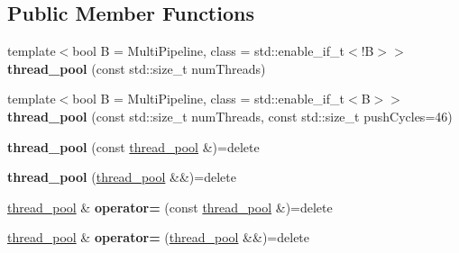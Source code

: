 \subsection*{Public Member Functions}
\begin{DoxyCompactItemize}
\item 
\mbox{\label{classsequoia_1_1concurrency_1_1thread__pool_a70dbd1cce0c534b03b8255945afe1ab3}} 
{\footnotesize template$<$bool B = Multi\+Pipeline, class  = std\+::enable\+\_\+if\+\_\+t$<$!\+B$>$$>$ }\\{\bfseries thread\+\_\+pool} (const std\+::size\+\_\+t num\+Threads)
\item 
\mbox{\label{classsequoia_1_1concurrency_1_1thread__pool_acedcbcd7f9b06df68eafa7af26327a1e}} 
{\footnotesize template$<$bool B = Multi\+Pipeline, class  = std\+::enable\+\_\+if\+\_\+t$<$\+B$>$$>$ }\\{\bfseries thread\+\_\+pool} (const std\+::size\+\_\+t num\+Threads, const std\+::size\+\_\+t push\+Cycles=46)
\item 
\mbox{\label{classsequoia_1_1concurrency_1_1thread__pool_a43bb826eda0785a478b90dd01d436194}} 
{\bfseries thread\+\_\+pool} (const \mbox{\hyperlink{classsequoia_1_1concurrency_1_1thread__pool}{thread\+\_\+pool}} \&)=delete
\item 
\mbox{\label{classsequoia_1_1concurrency_1_1thread__pool_a81a375145949bd9064545e3d46bce1fa}} 
{\bfseries thread\+\_\+pool} (\mbox{\hyperlink{classsequoia_1_1concurrency_1_1thread__pool}{thread\+\_\+pool}} \&\&)=delete
\item 
\mbox{\label{classsequoia_1_1concurrency_1_1thread__pool_aa47415876ba7be4e3ba67228f3e2918d}} 
\mbox{\hyperlink{classsequoia_1_1concurrency_1_1thread__pool}{thread\+\_\+pool}} \& {\bfseries operator=} (const \mbox{\hyperlink{classsequoia_1_1concurrency_1_1thread__pool}{thread\+\_\+pool}} \&)=delete
\item 
\mbox{\label{classsequoia_1_1concurrency_1_1thread__pool_ac324e271c6f503d73c21d6b882025974}} 
\mbox{\hyperlink{classsequoia_1_1concurrency_1_1thread__pool}{thread\+\_\+pool}} \& {\bfseries operator=} (\mbox{\hyperlink{classsequoia_1_1concurrency_1_1thread__pool}{thread\+\_\+pool}} \&\&)=delete

\end{DoxyCompactItemize}
